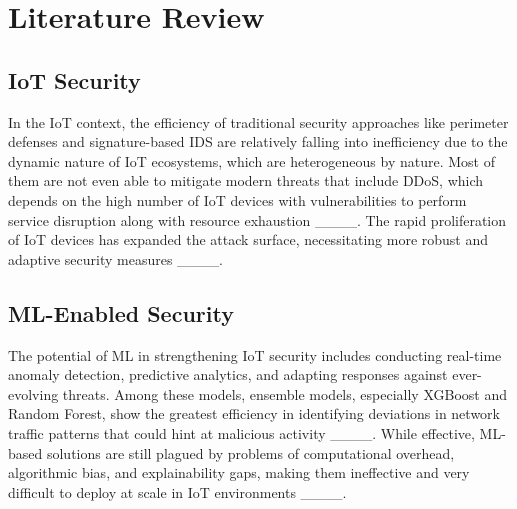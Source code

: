 \section{Literature Review}
\label{sec:lit_review}

\subsection{IoT Security}
In the IoT context, the efficiency of traditional security approaches like perimeter defenses and signature-based IDS are relatively falling into inefficiency due to the dynamic nature of IoT ecosystems, which are heterogeneous by nature. Most of them are not even able to mitigate modern threats that include DDoS, which depends on the high number of IoT devices with vulnerabilities to perform service disruption along with resource exhaustion ____. The rapid proliferation of IoT devices has expanded the attack surface, necessitating more robust and adaptive security measures ____.
\vspace{\baselineskip}

\subsection{ML-Enabled Security}
The potential of ML in strengthening IoT security includes conducting real-time anomaly detection, predictive analytics, and adapting responses against ever-evolving threats. Among these models, ensemble models, especially XGBoost and Random Forest, show the greatest efficiency in identifying deviations in network traffic patterns that could hint at malicious activity ____. While effective, ML-based solutions are still plagued by problems of computational overhead, algorithmic bias, and explainability gaps, making them ineffective and very difficult to deploy at scale in IoT environments ____.
\vspace{\baselineskip}

